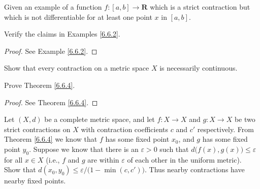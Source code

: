 \begin{exercise}\label{ex 6.6.4}
    Given an example of a function \(f : [a, b] \to \mathbf{R}\) which is a strict contraction but which is not differentiable for at least one point \(x\) in \([a, b]\).
\end{exercise}

\begin{exercise}\label{ex 6.6.5}
    Verify the claims in Examples \ref{6.6.2}.
\end{exercise}

\begin{proof}
    See Example \ref{6.6.2}.
\end{proof}

\begin{exercise}\label{ex 6.6.6}
    Show that every contraction on a metric space \(X\) is necessarily continuous.
\end{exercise}

\begin{exercise}\label{ex 6.6.7}
    Prove Theorem \ref{6.6.4}.
\end{exercise}

\begin{proof}
    See Theorem \ref{6.6.4}.
\end{proof}

\begin{exercise}\label{ex 6.6.8}
    Let \((X, d)\) be a complete metric space, and let \(f : X \to X\) and \(g : X \to X\) be two strict contractions on \(X\) with contraction coefficients \(c\) and \(c'\) respectively.
    From Theorem \ref{6.6.4} we know that \(f\) has some fixed point \(x_0\), and \(g\) has some fixed point \(y_0\).
    Suppose we know that there is an \(\varepsilon > 0\) such that \(d\big(f(x), g(x)\big) \leq \varepsilon\) for all \(x \in X\)
    (i.e., \(f\) and \(g\) are within \(\varepsilon\) of each other in the uniform metric).
    Show that \(d(x_0, y_0) \leq \varepsilon / \big(1 - \min(c, c')\big)\).
    Thus nearby contractions have nearby fixed points.
\end{exercise}